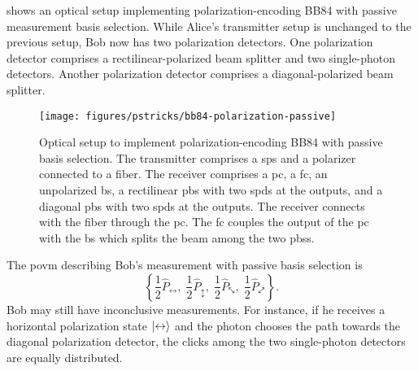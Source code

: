  shows an optical setup implementing polarization-encoding BB84 with passive measurement basis selection.
While Alice's transmitter setup is unchanged to the previous setup, Bob now has two polarization detectors.
One polarization detector comprises a rectilinear-polarized beam splitter and two single-photon detectors.
Another polarization detector comprises a diagonal-polarized beam splitter.
\begin{figure}[htb]
	\centering
	\texttt{[image: figures/pstricks/bb84-polarization-passive]}
	\caption{Optical setup to implement polarization-encoding BB84 with passive basis selection. The transmitter comprises a \gls{sps} and a polarizer connected to a fiber. The receiver comprises a \gls{pc}, a \gls{fc}, an unpolarized \gls{bs}, a rectilinear \gls{pbs} with two \gls{spd}s at the outputs, and a diagonal \gls{pbs} with two \gls{spd}s at the outputs. The receiver connects with the fiber through the \gls{pc}. The \gls{fc} couples the output of the \gls{pc} with the \gls{bs} which splits the beam among the two \gls{pbs}s.}\label{fig:polarization_encoding_passive}
\end{figure}
The \gls{povm} describing Bob's measurement with passive basis selection is
\begin{equation}
	\left\{
		\frac{1}{2}\hat{P}_{\leftrightarrow},
		\;
		\frac{1}{2}\hat{P}_{\updownarrow},
		\;
		\frac{1}{2}\hat{P}_{\nwsearrow},
		\;
		\frac{1}{2}\hat{P}_{\neswarrow}
	\right\}
	.
\end{equation}
Bob may still have inconclusive measurements.
For instance, if he receives a horizontal polarization state $\lvert\leftrightarrow\rangle$ and the photon chooses the path towards the diagonal polarization detector, the clicks among the two single-photon detectors are equally distributed.
